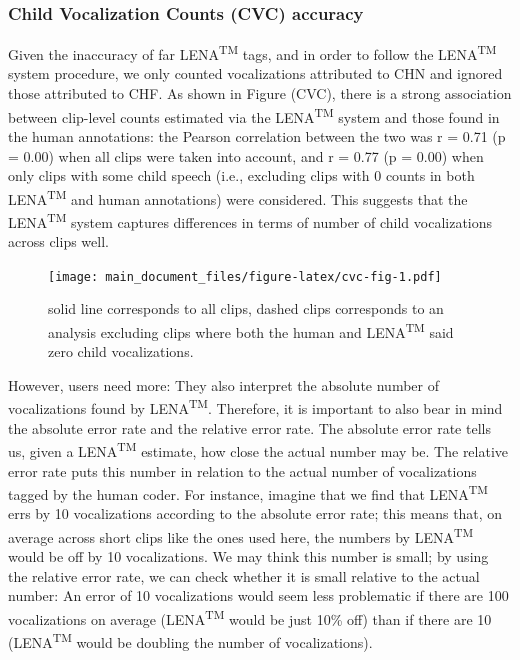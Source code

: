 \documentclass[english,floatsintext,man]{apa6}
\begin{document}
\subsubsection{Child Vocalization Counts (CVC)
accuracy}\label{child-vocalization-counts-cvc-accuracy}

Given the inaccuracy of far LENA\textsuperscript{TM} tags, and in order
to follow the LENA\textsuperscript{TM} system procedure, we only counted
vocalizations attributed to CHN and ignored those attributed to CHF. As
shown in Figure (CVC), there is a strong association between clip-level
counts estimated via the LENA\textsuperscript{TM} system and those found
in the human annotations: the Pearson correlation between the two was r
= 0.71 (p = 0.00) when all clips were taken into account, and r = 0.77
(p = 0.00) when only clips with some child speech (i.e., excluding clips
with 0 counts in both LENA\textsuperscript{TM} and human annotations)
were considered. This suggests that the LENA\textsuperscript{TM} system
captures differences in terms of number of child vocalizations across
clips well.

\begin{figure}
\centering
\texttt{[image: main\_document\_files/figure-latex/cvc-fig-1.pdf]}
\caption{\label{fig:cvc-fig}solid line corresponds to all clips, dashed
clips corresponds to an analysis excluding clips where both the human
and LENA\textsuperscript{TM} said zero child vocalizations.}
\end{figure}

However, users need more: They also interpret the absolute number of
vocalizations found by LENA\textsuperscript{TM}. Therefore, it is
important to also bear in mind the absolute error rate and the relative
error rate. The absolute error rate tells us, given a
LENA\textsuperscript{TM} estimate, how close the actual number may be.
The relative error rate puts this number in relation to the actual
number of vocalizations tagged by the human coder. For instance, imagine
that we find that LENA\textsuperscript{TM} errs by 10 vocalizations
according to the absolute error rate; this means that, on average across
short clips like the ones used here, the numbers by
LENA\textsuperscript{TM} would be off by 10 vocalizations. We may think
this number is small; by using the relative error rate, we can check
whether it is small relative to the actual number: An error of 10
vocalizations would seem less problematic if there are 100 vocalizations
on average (LENA\textsuperscript{TM} would be just 10\% off) than if
there are 10 (LENA\textsuperscript{TM} would be doubling the number of
vocalizations).
\end{document}
